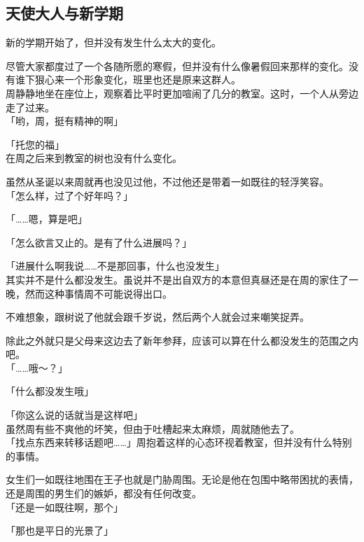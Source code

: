 \subsection{天使大人与新学期}

新的学期开始了，但并没有发生什么太大的变化。

尽管大家都度过了一个各随所愿的寒假，但并没有什么像暑假回来那样的变化。没有谁下狠心来一个形象变化，班里也还是原来这群人。\\

周静静地坐在座位上，观察着比平时更加喧闹了几分的教室。这时，一个人从旁边走了过来。\\

「哟，周，挺有精神的啊」

「托您的福」\\

在周之后来到教室的树也没有什么变化。

虽然从圣诞以来周就再也没见过他，不过他还是带着一如既往的轻浮笑容。\\

「怎么样，过了个好年吗？」

「……嗯，算是吧」

「怎么欲言又止的。是有了什么进展吗？」

「进展什么啊我说……不是那回事，什么也没发生」\\

其实并不是什么都没发生。虽说并不是出自双方的本意但真昼还是在周的家住了一晚，然而这种事情周不可能说得出口。

不难想象，跟树说了他就会跟千岁说，然后两个人就会过来嘲笑捉弄。

除此之外就只是父母来这边去了新年参拜，应该可以算在什么都没发生的范围之内吧。\\

「……哦～？」

「什么都没发生哦」

「你这么说的话就当是这样吧」\\

虽然周有些不爽他的坏笑，但由于吐槽起来太麻烦，周就随他去了。\\

「找点东西来转移话题吧……」周抱着这样的心态环视着教室，但并没有什么特别的事情。

女生们一如既往地围在王子也就是门胁周围。无论是他在包围中略带困扰的表情，还是周围的男生们的嫉妒，都没有任何改变。\\

「还是一如既往啊，那个」

「那也是平日的光景了」\\

